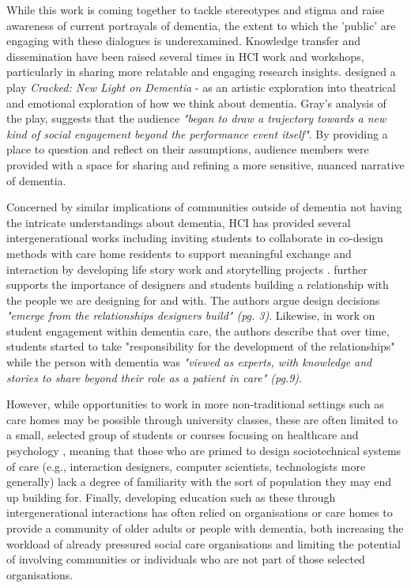 While this work is coming together to tackle stereotypes and stigma and raise awareness of current portrayals of dementia, the extent to which the 'public' are engaging with these dialogues is underexamined.  Knowledge transfer and dissemination have been raised several times in HCI work and workshops, particularly in sharing more relatable and engaging research insights. \cite{gray2020knowledge} designed a play \textit{Cracked: New Light on Dementia} - as an artistic exploration into theatrical and emotional exploration of how we think about dementia. Gray's analysis of the play, suggests that the audience \textit{"began to draw a trajectory towards a new kind of social engagement beyond the performance event itself"}. By providing a place to question and reflect on their assumptions, audience members were provided with a space for sharing and refining a more sensitive, nuanced narrative of dementia. 

Concerned by similar implications of communities outside of dementia not having the intricate understandings about dementia, HCI has provided several intergenerational works including inviting students to collaborate in co-design methods with care home residents to support meaningful exchange and interaction by developing life story work \citep{foley_student_2020} and storytelling projects \citep{hannan_zeitgeist_2019}. \cite{hendriks_challenges_2014} further supports the importance of designers and students building a relationship with the people we are designing for and with. The authors argue design decisions \textit{"emerge from the relationships designers build" (pg. 3)}. Likewise, in \cite{foley_student_2020} work on student engagement within dementia care, the authors describe that over time, students started to take "responsibility for the development of the relationships" while the person with dementia was \textit{"viewed as experts, with knowledge and stories to share beyond their role as a patient in care" (pg.9)}. 

However, while opportunities to work in more non-traditional settings such as care homes may be possible through university classes, these are often limited to a small, selected group of students or courses focusing on healthcare and psychology \citep{kinnunen_understanding_2018}, meaning that those who are primed to design sociotechnical systems of care (e.g., interaction designers, computer scientists, technologists more generally) lack a degree of familiarity with the sort of population they may end up building for. Finally, developing education such as these through intergenerational interactions has often relied on organisations or care homes to provide a community of older adults or people with dementia, both increasing the workload of already pressured social care organisations and limiting the potential of involving communities or individuals who are not part of those selected organisations. 

